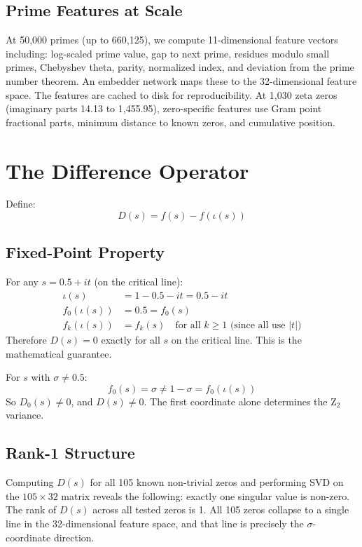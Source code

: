 \documentclass[11pt]{article}
\begin{document}
\subsection{Prime Features at Scale}

At 50,000 primes (up to 660,125), we compute 11-dimensional feature vectors including: log-scaled prime value, gap to next prime, residues modulo small primes, Chebyshev theta, parity, normalized index, and deviation from the prime number theorem. An embedder network maps these to the 32-dimensional feature space. The features are cached to disk for reproducibility. At 1,030 zeta zeros (imaginary parts 14.13 to 1,455.95), zero-specific features use Gram point fractional parts, minimum distance to known zeros, and cumulative position.

\section{The Difference Operator}

Define:
$$D(s) = f(s) - f(\iota(s))$$

\subsection{Fixed-Point Property}

For any $s = 0.5 + it$ (on the critical line):
\begin{align*}
\iota(s) &= 1 - 0.5 - it = 0.5 - it \\
f_0(\iota(s)) &= 0.5 = f_0(s) \\
f_k(\iota(s)) &= f_k(s) \quad \text{for all } k \ge 1 \text{ (since all use } |t|)
\end{align*}
Therefore $D(s) = 0$ exactly for all $s$ on the critical line. This is the mathematical guarantee.

For $s$ with $\sigma \neq 0.5$:
$$f_0(s) = \sigma \neq 1-\sigma = f_0(\iota(s))$$
So $D_0(s) \neq 0$, and $D(s) \neq 0$. The first coordinate alone determines the Z$_2$ variance.

\subsection{Rank-1 Structure}

Computing $D(s)$ for all 105 known non-trivial zeros and performing SVD on the $105 \times 32$ matrix reveals the following: exactly one singular value is non-zero. The rank of $D(s)$ across all tested zeros is 1. All 105 zeros collapse to a single line in the 32-dimensional feature space, and that line is precisely the $\sigma$-coordinate direction.
\end{document}
